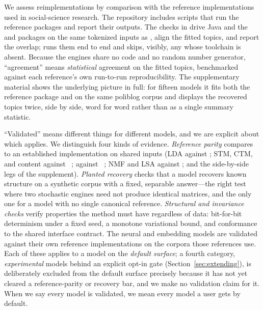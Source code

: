 \documentclass[article]{jss}
\begin{document}
We assess reimplementations by comparison with the reference implementations
used in social-science research. The repository includes scripts that run the
reference packages and report their outputs. The checks in  drive Java  and
the   and  packages on the same tokenized inputs
as , align the fitted topics, and report the overlap;
 runs them end to end and skips, visibly, any whose
toolchain is absent. Because the engines share no code and no random number
generator, ``agreement'' means \emph{statistical} agreement on the fitted topics,
benchmarked against each reference's own run-to-run reproducibility. The
supplementary material shows the underlying picture in full: for fifteen models it
fits both the reference package and  on the same poliblog corpus and
displays the recovered topics twice, side by side, word for word rather than as a
single summary statistic.

``Validated'' means different things for different models, and we are explicit
about which applies. We distinguish four kinds of evidence. \emph{Reference
parity} compares  to an established implementation on shared inputs
(LDA against ; STM, CTM, and content against ~;
 against ~; NMF and LSA against
; and the side-by-side legs of the supplement). \emph{Planted
recovery} checks that a model recovers known structure on a synthetic corpus with
a fixed, separable answer---the right test where two stochastic engines need not
produce identical matrices, and the only one for a model with no single canonical
reference. \emph{Structural and invariance checks} verify properties the method
must have regardless of data: bit-for-bit determinism under a fixed seed, a
monotone variational bound, and conformance to the shared interface contract. The
neural and embedding models are validated against their own reference
implementations on the corpora those references use. Each of these applies to a
model on the \emph{default surface}; a fourth category, \emph{experimental} models
behind an explicit opt-in gate (Section~\ref{sec:extending}), is deliberately
excluded from the default surface precisely because it has not yet cleared a
reference-parity or recovery bar, and we make no validation claim for it. When we
say every model is validated, we mean every model a user gets by default.
\end{document}
